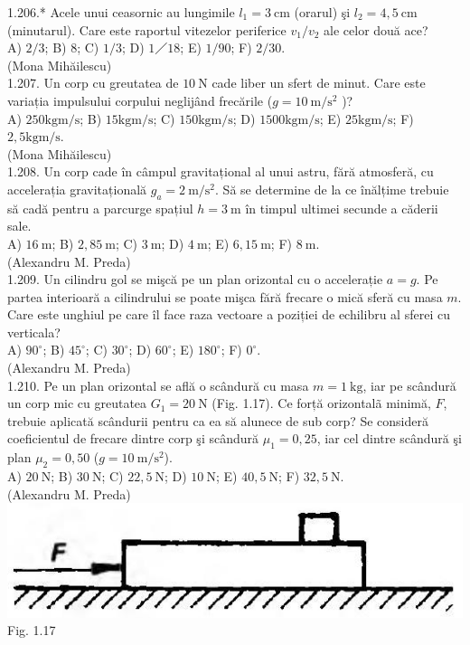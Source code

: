 1.206.* Acele unui ceasornic au lungimile $l_{1}=3 \mathrm{~cm}$ (orarul) şi $l_{2}=4,5 \mathrm{~cm}$ (minutarul). Care este raportul vitezelor periferice $v_{1} / v_{2}$ ale celor două ace?\\ A) $2 / 3$; B) $8$; C) $1 / 3$; D) $1／18$; E) $1 / 90$; F) $2 / 30$.\\ (Mona Mihăilescu)\\

1.207. Un corp cu greutatea de $10 \mathrm{~N}$ cade liber un sfert de minut. Care este variația impulsului corpului neglijând frecările ($g=10 \mathrm{~m} / \mathrm{s}^{2}$ )?\\ A) $250 \mathrm{kgm} / \mathrm{s}$; B) $15 \mathrm{kgm} / \mathrm{s}$; C) $150 \mathrm{kgm} / \mathrm{s}$; D) $1500 \mathrm{kgm} / \mathrm{s}$; E) $25 \mathrm{kgm} / \mathrm{s}$; F) $2,5 \mathrm{kgm} / \mathrm{s}$.\\ (Mona Mihăilescu)\\

1.208. Un corp cade în câmpul gravitațional al unui astru, fără atmosferă, cu accelerația gravitațională $g_{a}=2 \mathrm{~m} / \mathrm{s}^{2}$. Să se determine de la ce înălțime trebuie să cadă pentru a parcurge spațiul $h=3 \mathrm{~m}$ în timpul ultimei secunde a căderii sale.\\ A) $16 \mathrm{~m}$; B) $2,85 \mathrm{~m}$; C) $3 \mathrm{~m}$; D) $4 \mathrm{~m}$; E) $6,15 \mathrm{~m}$; F) $8 \mathrm{~m}$.\\ (Alexandru M. Preda)\\

1.209. Un cilindru gol se mişcă pe un plan orizontal cu o accelerație $a=g$. Pe partea interioară a cilindrului se poate mişca fără frecare o mică sferă cu masa $m$. Care este unghiul pe care îl face raza vectoare a poziției de echilibru al sferei cu verticala?\\ A) $90^{\circ}$; B) $45^{\circ}$; C) $30^{\circ}$; D) $60^{\circ}$; E) $180^{\circ}$; F) $0^{\circ}$.\\ (Alexandru M. Preda)\\

1.210. Pe un plan orizontal se află o scândură cu masa $m=1 \mathrm{~kg}$, iar pe scândură un corp mic cu greutatea $G_{1}=20 \mathrm{~N}$ (Fig. 1.17). Ce forță orizontalã minimă, $F$, trebuie aplicată scândurii pentru ca ea să alunece de sub corp? Se consideră coeficientul de frecare dintre corp şi scândură $\mu_{1}=0,25$, iar cel dintre scândură şi plan $\mu_{2}=0,50$ ($g=10 \mathrm{~m} / \mathrm{s}^{2}$).\\ A) $20 \mathrm{~N}$; B) $30 \mathrm{~N}$; C) $22,5 \mathrm{~N}$; D) $10 \mathrm{~N}$; E) $40,5 \mathrm{~N}$; F) $32,5 \mathrm{~N}$.\\ (Alexandru M. Preda)\\ \includegraphics[width=0.4\linewidth]{images/2025_07_01_5b3ff9fa0d508c8e9f17g-048} Fig. 1.17\\

